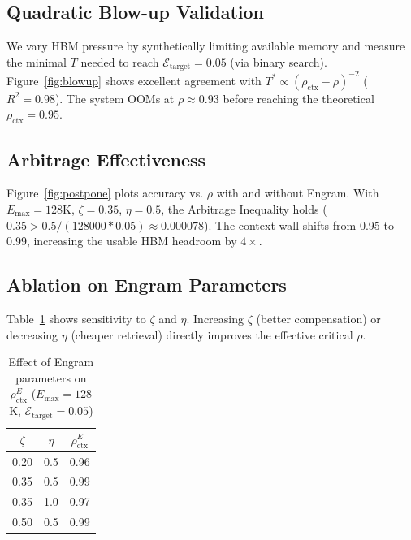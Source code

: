 \documentclass[11pt,a4paper]{article}
\theoremstyle{plain}
\theoremstyle{definition}
\begin{document}
\subsection{Quadratic Blow-up Validation}
We vary HBM pressure by synthetically limiting available memory and measure the minimal $T$ needed to reach $\mathcal{E}_{\text{target}}=0.05$ (via binary search). Figure~\ref{fig:blowup} shows excellent agreement with $T^* \propto (\rho_{\text{ctx}}-\rho)^{-2}$ ($R^2=0.98$). The system OOMs at $\rho\approx0.93$ before reaching the theoretical $\rho_{\text{ctx}}=0.95$.

\subsection{Arbitrage Effectiveness}
Figure~\ref{fig:postpone} plots accuracy vs. $\rho$ with and without Engram. With $E_{\max}=128$K, $\zeta=0.35$, $\eta=0.5$, the Arbitrage Inequality holds ($0.35 > 0.5/(128000*0.05)\approx0.000078$). The context wall shifts from 0.95 to 0.99, increasing the usable HBM headroom by $4\times$.

\subsection{Ablation on Engram Parameters}
Table~\ref{tab:ablate} shows sensitivity to $\zeta$ and $\eta$. Increasing $\zeta$ (better compensation) or decreasing $\eta$ (cheaper retrieval) directly improves the effective critical $\rho$.

\begin{table}[t]
\centering
\caption{Effect of Engram parameters on $\rho_{\text{ctx}}^E$ ($E_{\max}=128$K, $\mathcal{E}_{\text{target}}=0.05$)}
\begin{tabular}{@{}ccc@{}}
\toprule
$\zeta$ & $\eta$ & $\rho_{\text{ctx}}^E$ \\
\midrule
0.20 & 0.5 & 0.96 \\
0.35 & 0.5 & 0.99 \\
0.35 & 1.0 & 0.97 \\
0.50 & 0.5 & 0.99 \\
\bottomrule
\end{tabular}
\label{tab:ablate}
\end{table}
\end{document}
